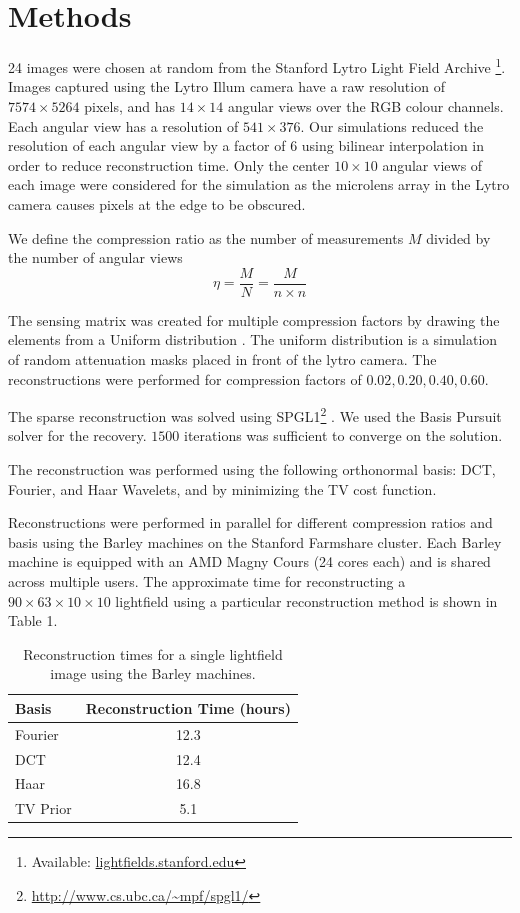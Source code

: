 \documentclass[10pt,twocolumn,letterpaper]{article}
\begin{document}
\section{Methods}


24 images were chosen at random from the Stanford Lytro Light Field Archive \footnote{Available: \url{lightfields.stanford.edu}}. Images captured using the Lytro Illum camera have a raw resolution of $7574 \times 5264$ pixels, and has $14 \times 14$ angular views over the RGB colour channels. Each angular view has a resolution of $541 \times 376$. Our simulations reduced the resolution of each angular view by a factor of $6$ using bilinear interpolation in order to reduce reconstruction time. Only the center $10 \times 10$ angular views of each image were considered for the simulation as the microlens array in the Lytro camera causes pixels at the edge to be obscured.


We define the compression ratio as the number of measurements $M$ divided by the number of angular views \[ \eta = \frac{M}{N} = \frac{M}{n \times n}\]

The sensing matrix was created for multiple compression factors by drawing the elements from a Uniform distribution \cite{Rauhut11}. The uniform distribution is a simulation of random attenuation masks placed in front of the lytro camera. The reconstructions were performed for compression factors of $0.02, 0.20, 0.40, 0.60$.

The sparse reconstruction was solved using SPGL1\footnote{\url{http://www.cs.ubc.ca/~mpf/spgl1/}} \cite{BasisPursuit1}\cite{BasisPursuit2}. We used the Basis Pursuit solver for the recovery. $1500$ iterations was sufficient to converge on the solution.

The reconstruction was performed using the following orthonormal basis: DCT, Fourier, and Haar Wavelets, and by minimizing the TV cost function.


Reconstructions were performed in parallel for different compression ratios and basis using the Barley machines on the Stanford Farmshare cluster. Each Barley machine is equipped with an AMD Magny Cours (24 cores each) and is shared across multiple users. The approximate time for reconstructing a $90 \times 63 \times 10 \times 10$ lightfield using a particular reconstruction method is shown in Table 1.

\begin{table}
  \begin{center}
  \begin{tabular}{|l|c|}
  \hline
  Basis & Reconstruction Time (hours)\\
  \hline\hline
  Fourier & 12.3 \\
  DCT & 12.4 \\
  Haar & 16.8\\
  TV Prior & 5.1\\ 
  \hline
  \end{tabular}
  \end{center}
  \caption{Reconstruction times for a single lightfield image using the Barley machines.}
\end{table}
\end{document}
